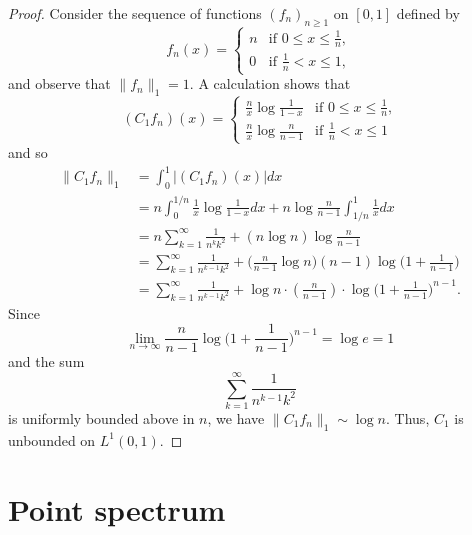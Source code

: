 \documentclass[11pt]{amsart}
\numberwithin{equation}{section}
\theoremstyle{plain}
\theoremstyle{definition}
\renewcommand{\leq}{\leqslant}
\renewcommand{\geq}{\geqslant}
\newcommand{\0}{{\color{lightgray}0}}
\begin{document}
\begin{proof}
Consider the sequence of  functions $(f_n)_{n \geq 1}$ on $[0, 1]$ defined by 
\begin{equation}\label{ffnnnn}
f_n(x)=\begin{cases} 
n & \mbox{if $0\leq x\leq \frac{1}{n}$},\\
0 & \mbox{if $\frac{1}{n} <   x\leq 1$},
\end{cases} 
\end{equation}
and observe that $\|f_{n}\|_{1} = 1$. A calculation shows that 
$$(C_1 f_n)(x) = 
\begin{cases}
{\displaystyle  \frac{n}{x}  \log \frac{1}{1 - x}} & \mbox{if $0 \leq x \leq \frac{1}{n}$,}\\[10pt]
{\displaystyle \frac{n}{x} \log \frac{n}{n - 1}} & \mbox{if $\frac{1}{n} < x \leq 1$}
\end{cases}
$$
and so 
\begin{align*}
\|C_1 f_n\|_{1} & =  \int_{0}^{1} |(C_1 f_n)(x)| dx\\
 & = n \int_{0}^{1/n} \frac{1}{x} \log \frac{1}{1 - x} dx + n \log \frac{n}{n - 1} \int_{1/n}^{1} \frac{1}{x} dx\\
& = n \sum_{k = 1}^{\infty} \frac{1}{n^k k^2} + (n \log n) \log \frac{n}{n - 1}\\
& = \sum_{k = 1}^{\infty} \frac{1}{n^{k - 1} k^2} + \big(\frac{n}{n - 1} \log n\big) (n - 1) \log \Big(1 + \frac{1}{n - 1}\Big)\\
& =  \sum_{k = 1}^{\infty} \frac{1}{n^{k - 1} k^2} + \log n \cdot ( \frac{n}{n - 1})  \cdot  \log \Big(1 + \frac{1}{n - 1}\Big)^{n - 1}.
\end{align*}
Since
$$\lim_{n \to \infty} \frac{n}{n - 1}  \log \Big(1 + \frac{1}{n - 1}\Big)^{n - 1} = \log e = 1$$
and the sum
$$ \sum_{k = 1}^{\infty} \frac{1}{n^{k - 1} k^2}$$ is uniformly bounded above in $n$, we have 
$\|C_1 f_{n}\|_{1} \sim \log n.$
Thus,  $C_1$ is unbounded  on $L^1(0, 1)$.
\end{proof}

\section{Point spectrum} 
\end{document}
